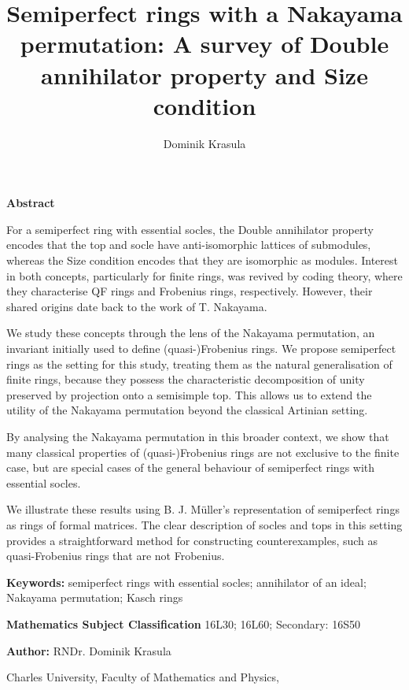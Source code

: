 \documentclass[11pt]{article}
\title{Semiperfect rings with a Nakayama permutation: A survey of Double annihilator property and Size condition}
\author{Dominik Krasula
}
\theoremstyle{plain}
\theoremstyle{remark}
\theoremstyle{plain}
\begin{document}
\maketitle




\textbf{Abstract} 

For a semiperfect ring with essential socles, the Double annihilator property encodes that the top and socle have anti-isomorphic lattices of submodules, whereas the Size condition encodes that they are isomorphic as modules. Interest in both concepts, particularly for finite rings, was revived by coding theory, where they characterise QF rings and Frobenius rings, respectively. However, their shared origins date back to the work of T. Nakayama.

We study these concepts through the lens of the Nakayama permutation, an invariant initially used to define (quasi-)Frobenius rings. We propose semiperfect rings as the setting for this study, treating them as the natural generalisation of finite rings, because they possess the characteristic decomposition of unity preserved by projection onto a semisimple top. This allows us to extend the utility of the Nakayama permutation beyond the classical Artinian setting.

By analysing the Nakayama permutation in this broader context, we show that many classical properties of (quasi-)Frobenius rings are not exclusive to the finite case, but are special cases of the general behaviour of semiperfect rings with essential socles.

We illustrate these results using B. J. Müller's representation of semiperfect rings as rings of formal matrices. The clear description of socles and tops in this setting provides a straightforward method for constructing counterexamples, such as quasi-Frobenius rings that are not Frobenius.

\smallskip 


\textbf{Keywords:} semiperfect rings with essential socles; annihilator of an ideal; Nakayama permutation; Kasch rings

\smallskip

\textbf{Mathematics Subject Classification} 16L30; 16L60; Secondary: 16S50

\smallskip

\noindent \textbf{Author:} RNDr. Dominik Krasula

Charles University, Faculty of Mathematics and Physics, 
\end{document}
